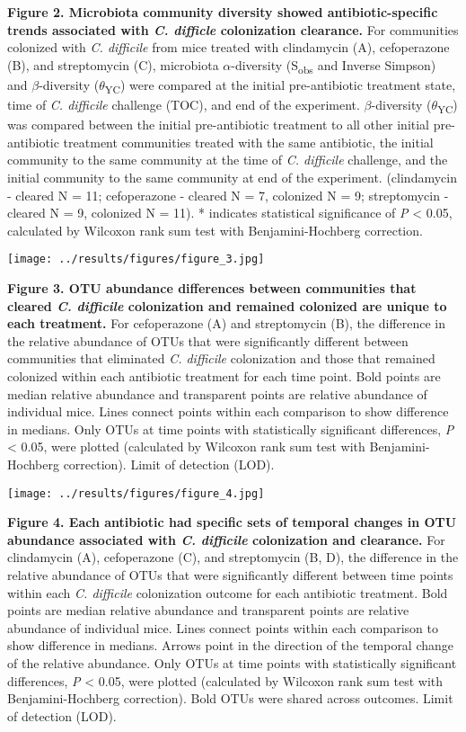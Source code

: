 \documentclass[11pt,]{article}
\begin{document}
\textbf{Figure 2. Microbiota community diversity showed
antibiotic-specific trends associated with \emph{C. difficle}
colonization clearance.} For communities colonized with \emph{C.
difficile} from mice treated with clindamycin (A), cefoperazone (B), and
streptomycin (C), microbiota \(\alpha\)-diversity (S\textsubscript{obs}
and Inverse Simpson) and \(\beta\)-diversity
(\(\theta\)\textsubscript{YC}) were compared at the initial
pre-antibiotic treatment state, time of \emph{C. difficile} challenge
(TOC), and end of the experiment. \(\beta\)-diversity
(\(\theta\)\textsubscript{YC}) was compared between the initial
pre-antibiotic treatment to all other initial pre-antibiotic treatment
communities treated with the same antibiotic, the initial community to
the same community at the time of \emph{C. difficile} challenge, and the
initial community to the same community at end of the experiment.
(clindamycin - cleared N = 11; cefoperazone - cleared N = 7, colonized N
= 9; streptomycin - cleared N = 9, colonized N = 11). * indicates
statistical significance of \emph{P} \textless{} 0.05, calculated by
Wilcoxon rank sum test with Benjamini-Hochberg correction.

\hfill\break

\texttt{[image: ../results/figures/figure\_3.jpg]}

\textbf{Figure 3. OTU abundance differences between communities that
cleared \emph{C. difficile} colonization and remained colonized are
unique to each treatment.} For cefoperazone (A) and streptomycin (B),
the difference in the relative abundance of OTUs that were significantly
different between communities that eliminated \emph{C. difficile}
colonization and those that remained colonized within each antibiotic
treatment for each time point. Bold points are median relative abundance
and transparent points are relative abundance of individual mice. Lines
connect points within each comparison to show difference in medians.
Only OTUs at time points with statistically significant differences,
\emph{P} \textless{} 0.05, were plotted (calculated by Wilcoxon rank sum
test with Benjamini-Hochberg correction). Limit of detection (LOD).

\hfill\break

\texttt{[image: ../results/figures/figure\_4.jpg]}

\textbf{Figure 4. Each antibiotic had specific sets of temporal changes
in OTU abundance associated with \emph{C. difficile} colonization and
clearance.} For clindamycin (A), cefoperazone (C), and streptomycin (B,
D), the difference in the relative abundance of OTUs that were
significantly different between time points within each \emph{C.
difficile} colonization outcome for each antibiotic treatment. Bold
points are median relative abundance and transparent points are relative
abundance of individual mice. Lines connect points within each
comparison to show difference in medians. Arrows point in the direction
of the temporal change of the relative abundance. Only OTUs at time
points with statistically significant differences, \emph{P} \textless{}
0.05, were plotted (calculated by Wilcoxon rank sum test with
Benjamini-Hochberg correction). Bold OTUs were shared across outcomes.
Limit of detection (LOD).
\end{document}
